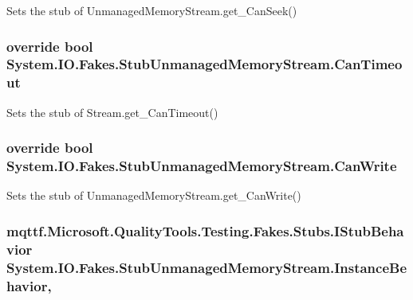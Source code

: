Sets the stub of Unmanaged\-Memory\-Stream.\-get\-\_\-\-Can\-Seek()

\hypertarget{class_system_1_1_i_o_1_1_fakes_1_1_stub_unmanaged_memory_stream_a388290cf0869b57edf84a7c77a986313}{
\subsubsection[{Can\-Timeout}]{\setlength{\rightskip}{0pt plus 5cm}override bool System.\-I\-O.\-Fakes.\-Stub\-Unmanaged\-Memory\-Stream.\-Can\-Timeout\hspace{0.3cm}{\ttfamily [get]}}}\label{class_system_1_1_i_o_1_1_fakes_1_1_stub_unmanaged_memory_stream_a388290cf0869b57edf84a7c77a986313}


Sets the stub of Stream.\-get\-\_\-\-Can\-Timeout()

\hypertarget{class_system_1_1_i_o_1_1_fakes_1_1_stub_unmanaged_memory_stream_ad8c60be3bfb804853c99e3aaa388659d}{
\subsubsection[{Can\-Write}]{\setlength{\rightskip}{0pt plus 5cm}override bool System.\-I\-O.\-Fakes.\-Stub\-Unmanaged\-Memory\-Stream.\-Can\-Write\hspace{0.3cm}{\ttfamily [get]}}}\label{class_system_1_1_i_o_1_1_fakes_1_1_stub_unmanaged_memory_stream_ad8c60be3bfb804853c99e3aaa388659d}


Sets the stub of Unmanaged\-Memory\-Stream.\-get\-\_\-\-Can\-Write()

\hypertarget{class_system_1_1_i_o_1_1_fakes_1_1_stub_unmanaged_memory_stream_a6e73d1984cc632359900126438f5c2a4}{
\subsubsection[{Instance\-Behavior}]{\setlength{\rightskip}{0pt plus 5cm}mqttf.\-Microsoft.\-Quality\-Tools.\-Testing.\-Fakes.\-Stubs.\-I\-Stub\-Behavior System.\-I\-O.\-Fakes.\-Stub\-Unmanaged\-Memory\-Stream.\-Instance\-Behavior\hspace{0.3cm}{\ttfamily [get]}, {\ttfamily [set]}}}\label{class_system_1_1_i_o_1_1_fakes_1_1_stub_unmanaged_memory_stream_a6e73d1984cc632359900126438f5c2a4}



